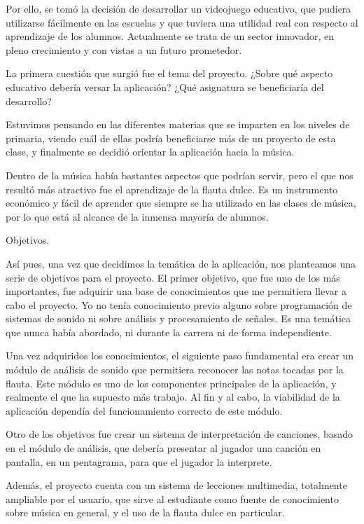 \documentclass[landscape]{article}
\newenvironment{nota}
{%
\begin{framed} \noindent\itshape
}
{%
\end{framed}\vspace{-0.5cm} }
\begin{document}
\begin{multicols*}{2}
Por ello, se tomó la decisión de desarrollar un videojuego educativo, que
pudiera utilizarse fácilmente en las escuelas y que tuviera una utilidad real
con respecto al aprendizaje de los alumnos. Actualmente se trata de un sector
innovador, en pleno crecimiento y con vistas a un futuro prometedor.

 La primera cuestión que surgió fue el tema del proyecto. ¿Sobre qué aspecto
educativo debería versar la aplicación? ¿Qué asignatura se beneficiaría del
desarrollo?

Estuvimos pensando en las diferentes materias que se imparten en los niveles de
primaria, viendo cuál de ellas podría beneficiarse más de un proyecto de esta
clase, y finalmente se decidió orientar la aplicación hacia la música.

 Dentro de la música había bastantes aspectos que podrían servir,
pero el que nos resultó más atractivo fue el  aprendizaje de la
flauta dulce. Es un instrumento económico y fácil de aprender que siempre se ha
utilizado en las clases de música, por lo que está al alcance de la inmensa
mayoría de alumnos.

\begin{nota}
  Objetivos.
\end{nota}

Así pues, una vez que decidimos la temática de la aplicación, nos planteamos una
serie de objetivos para el proyecto. El primer objetivo, que fue uno de los más
importantes, fue adquirir una base de conocimientos que me permitiera llevar a
cabo el proyecto. Yo no tenía conocimiento previo alguno sobre programación de
sistemas de sonido ni sobre análisis y procesamiento de señales. Es una temática
que nunca había abordado, ni durante la carrera ni de forma independiente.

Una vez adquiridos los conocimientos,  el siguiente paso
fundamental era crear un módulo de análisis de sonido que permitiera reconocer
las notas tocadas por la flauta. Este módulo es uno de los componentes
principales de la aplicación, y realmente el que ha supuesto más trabajo. Al fin
y al cabo, la viabilidad de la aplicación dependía del funcionamiento correcto
de este módulo. 

 Otro de los objetivos fue crear un sistema de interpretación de
canciones, basado en el módulo de análisis, que debería presentar al jugador una
canción en pantalla, en un pentagrama, para que el jugador la interprete.

 Además, el proyecto cuenta con un sistema de lecciones multimedia, totalmente
ampliable por el usuario, que sirve al estudiante como fuente de conocimiento
sobre música en general, y el uso de la flauta dulce en particular.


\end{multicols*}
\end{document}
